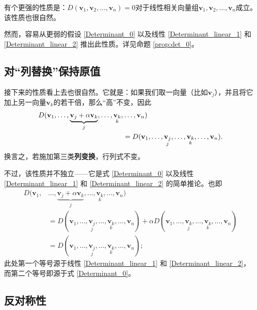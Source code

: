 \begin{remark*}
  有个更强的性质是：$D(\mathbf{v}_1,\mathbf{v}_2,\ldots,\mathbf{v}_n)=0$对于线性相关向量组$\mathbf{v}_1,\mathbf{v}_2,\ldots,\mathbf{v}_n$成立。该性质也很自然。

  然而，容易从更弱的假设 \eqref{Determinant_0} 以及线性 \eqref{Determinant_linear_1} 和 \eqref{Determinant_linear_2} 推出此性质。详见命题 \ref{prop:det_0}。
\end{remark*}

\subsection{对“列替换”保持原值}
接下来的性质看上去也很自然。它就是：如果我们取一向量（比如$\mathbf{v}_j$），并且将它加上另一向量$\mathbf{v}_k$的若干倍，那么“高”不变，因此
\begin{align}
  D(\mathbf{v}_1,\ldots,\underbrace{\mathbf{v}_j+\alpha\mathbf{v}_k}_j,\ldots,\underset{k}{\mathbf{v}_k},&\ldots,\mathbf{v}_n)\label{Preserve_column_replacement}\\
  &=D(\mathbf{v}_1,\ldots,\underset{j}{\mathbf{v}_j},\ldots,\underset{k}{\mathbf{v}_k},\ldots,\mathbf{v}_n).\notag
\end{align}
换言之，若施加第三类{\bf 列变换}，行列式不变。

不过，该性质并不独立——它是式 \eqref{Determinant_0} 以及线性 \eqref{Determinant_linear_1} 和 \eqref{Determinant_linear_2} 的简单推论。也即
\begin{align*}
  D(\mathbf{v}_{1},&\ldots,\underbrace{\mathbf{v}_{j}+\alpha\mathbf{v}_{k}}_{j},\ldots,\underset{k}{\mathbf{v}_k},\ldots,\mathbf{v}_{n})\\
  &=D(\mathbf{v}_{1},\ldots,\underset{j}{\mathbf{v}_j},\ldots,\underset{k}{\mathbf{v}_k},\ldots,\mathbf{v}_{n})+\alpha D(\mathbf{v}_{1},\ldots,\underset{j}{\mathbf{v}_k},\ldots,\underset{k}{\mathbf{v}_k},\ldots,\mathbf{v}_{n})\\
  &=D(\mathbf{v}_{1},\ldots,\underset{j}{\mathbf{v}_j},\ldots,\underset{k}{\mathbf{v}_k},\ldots,\mathbf{v}_{n});
\end{align*}
此处第一个等号源于线性 \eqref{Determinant_linear_1} 和 \eqref{Determinant_linear_2}，而第二个等号即源于式 \eqref{Determinant_0}。

\subsection{反对称性}

